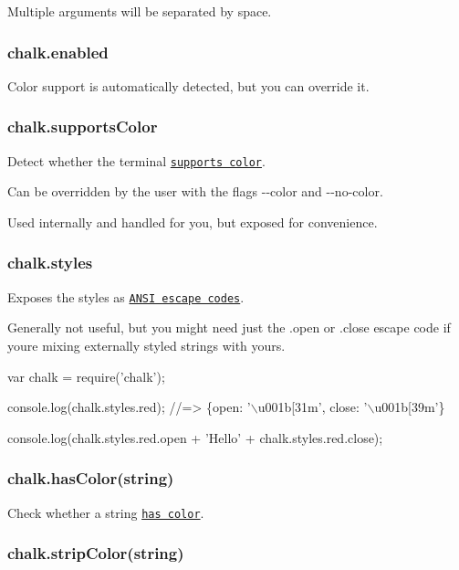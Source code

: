 Multiple arguments will be separated by space.

\subsubsection*{chalk.\+enabled}

Color support is automatically detected, but you can override it.

\subsubsection*{chalk.\+supports\+Color}

Detect whether the terminal \href{https://github.com/sindresorhus/supports-color}{\tt supports color}.

Can be overridden by the user with the flags {\ttfamily -\/-\/color} and {\ttfamily -\/-\/no-\/color}.

Used internally and handled for you, but exposed for convenience.

\subsubsection*{chalk.\+styles}

Exposes the styles as \href{https://github.com/sindresorhus/ansi-styles}{\tt A\+N\+SI escape codes}.

Generally not useful, but you might need just the {\ttfamily .open} or {\ttfamily .close} escape code if you\textquotesingle{}re mixing externally styled strings with yours.


\begin{DoxyCode}
var chalk = require('chalk');

console.log(chalk.styles.red);
//=> \{open: '\(\backslash\)u001b[31m', close: '\(\backslash\)u001b[39m'\}

console.log(chalk.styles.red.open + 'Hello' + chalk.styles.red.close);
\end{DoxyCode}


\subsubsection*{chalk.\+has\+Color(string)}

Check whether a string \href{https://github.com/sindresorhus/has-ansi}{\tt has color}.

\subsubsection*{chalk.\+strip\+Color(string)}

